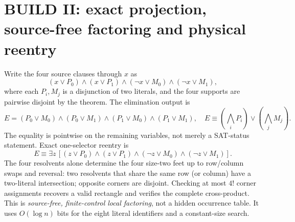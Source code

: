 \documentclass[11pt]{article}
\begin{document}
\section{BUILD II: exact projection, source-free factoring and physical reentry}
Write the four source clauses through $x$ as
\[
 (x\vee P_0)\wedge(x\vee P_1)\wedge
 (\neg x\vee M_0)\wedge(\neg x\vee M_1),
\]
where each $P_i,M_j$ is a disjunction of two literals, and the four supports are pairwise disjoint by the theorem. The elimination output is
\[
 E=(P_0\vee M_0)\wedge(P_0\vee M_1)\wedge
 (P_1\vee M_0)\wedge(P_1\vee M_1),
\quad
 E\equiv(\bigwedge_iP_i)\vee(\bigwedge_jM_j).
\]
The equality is pointwise on the remaining variables, not merely a SAT-status statement. Exact one-selector reentry is
\[
 E\equiv\exists z\,[(z\vee P_0)\wedge(z\vee P_1)\wedge(\neg z\vee M_0)\wedge(\neg z\vee M_1)].
\]
The four resolvents alone determine the four size-two feet up to row/column swaps and reversal: two resolvents that share the same row (or column) have a two-literal intersection; opposite corners are disjoint. Checking at most $4!$ corner assignments recovers a valid rectangle and verifies the complete cross-product. This is \emph{source-free, finite-control local factoring}, not a hidden occurrence table. It uses $O(\log n)$ bits for the eight literal identifiers and a constant-size search.
\end{document}
